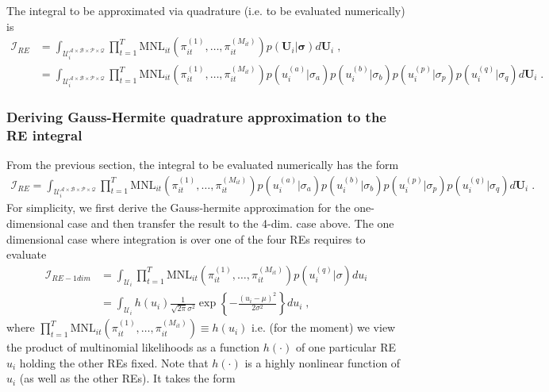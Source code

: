 \documentclass[a4paper,12pt]{scrartcl} %
\begin{document}
The integral to be approximated via quadrature (i.e. to be evaluated numerically) is
\begin{align*}
\mathcal{I}_{RE}&=\int_{\mathcal{U}_i^{\mathcal{A}\times \mathcal{B}\times \mathcal{P}\times \mathcal{Q}}} 
\prod_{t=1}^T
\text{MNL}_{it}\left(\pi_{it}^{(1)},\ldots,\pi_{it}^{(M_{it})}\right)
p\left(\boldsymbol{U}_i|\boldsymbol{\sigma}\right)d\boldsymbol{U}_i\;, \\
&=\int_{\mathcal{U}_i^{\mathcal{A}\times \mathcal{B}\times \mathcal{P}\times \mathcal{Q}}} 
\prod_{t=1}^T
\text{MNL}_{it}\left(\pi_{it}^{(1)},\ldots,\pi_{it}^{(M_{it})}\right)
p\left(u_i^{(a)}|\sigma_{a}\right)
p\left(u_i^{(b)}|\sigma_{b}\right)
p\left(u_i^{(p)}|\sigma_{p}\right)
p\left(u_i^{(q)}|\sigma_{q}\right)
d\boldsymbol{U}_i\;.
\end{align*}
%
%
%
%
%
\subsubsection{Deriving Gauss-Hermite quadrature approximation to the RE integral}
From the previous section, the integral to be evaluated numerically has the form
\begin{align*}
\mathcal{I}_{RE}=\int_{\mathcal{U}_i^{\mathcal{A}\times \mathcal{B}\times \mathcal{P}\times \mathcal{Q}}} 
\prod_{t=1}^T
\text{MNL}_{it}\left(\pi_{it}^{(1)},\ldots,\pi_{it}^{(M_{it})}\right)
p\left(u_i^{(a)}|\sigma_{a}\right)
p\left(u_i^{(b)}|\sigma_{b}\right)
p\left(u_i^{(p)}|\sigma_{p}\right)
p\left(u_i^{(q)}|\sigma_{q}\right)
d\boldsymbol{U}_i\;.
\end{align*}
For simplicity, we first derive the Gauss-hermite approximation for the one-dimensional case and then transfer the result to the 4-dim. case above.
The one dimensional case where integration is over one of the four REs requires to evaluate
\begin{align}\label{eq:oneDimInt}
\mathcal{I}_{RE-1dim}&=\int_{\mathcal{U}_i} 
\prod_{t=1}^T
\text{MNL}_{it}\left(\pi_{it}^{(1)},\ldots,\pi_{it}^{(M_{it})}\right)
p\left(u_i^{(q)}|\sigma\right)
du_i \nonumber \\ 
&=\int_{\mathcal{U}_i} 
h(u_i)
\frac{1}{\sqrt{2\pi}\sigma^2}\exp\left\{-\frac{(u_i-\mu)^2}{2\sigma^2}\right\}
du_i\;,
\end{align}
where $\prod_{t=1}^T\text{MNL}_{it}\left(\pi_{it}^{(1)},\ldots,\pi_{it}^{(M_{it})}\right)\equiv h(u_i)$ i.e.  (for the moment) we view the product of multinomial likelihoods as a function $h(\cdot)$ of one particular RE $u_i$ holding the other REs fixed. Note that $h(\cdot)$ is a highly nonlinear function of  $u_i$ (as well as the other REs). It takes the form
\end{document}
